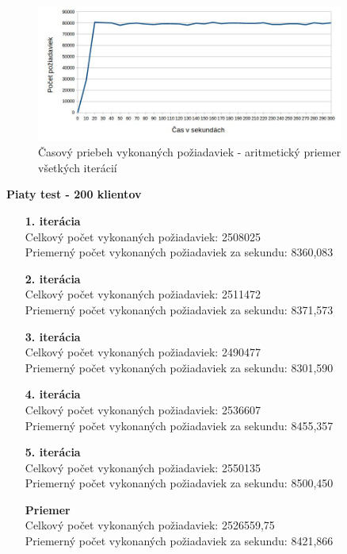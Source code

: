 \documentclass[12pt,oneside,final]{fithesis-utf8}
\begin{document}
\begin{itemize}
\begin{figure}[H]
  \centering
      \includegraphics[width=0.9\textwidth]{gatling2_4_distr.jpg}
  \caption{Časový priebeh vykonaných požiadaviek - aritmetický priemer všetkých iterácií}
\end{figure}

\textbf{Piaty test - 200 klientov}
\begin{itemize}

\item[\textbf{1. iterácia}]\ \\
Celkový počet vykonaných požiadaviek: 2508025\\
Priemerný počet vykonaných požiadaviek za sekundu: 8360,083

\item[\textbf{2. iterácia}]\ \\
Celkový počet vykonaných požiadaviek: 2511472\\
Priemerný počet vykonaných požiadaviek za sekundu: 8371,573

\item[\textbf{3. iterácia}]\ \\
Celkový počet vykonaných požiadaviek: 2490477\\
Priemerný počet vykonaných požiadaviek za sekundu: 8301,590

\item[\textbf{4. iterácia}]\ \\
Celkový počet vykonaných požiadaviek: 2536607\\
Priemerný počet vykonaných požiadaviek za sekundu: 8455,357

\item[\textbf{5. iterácia}]\ \\
Celkový počet vykonaných požiadaviek: 2550135\\
Priemerný počet vykonaných požiadaviek za sekundu: 8500,450

\item[\textbf{Priemer}]\ \\
Celkový počet vykonaných požiadaviek: 2526559,75\\
Priemerný počet vykonaných požiadaviek za sekundu: 8421,866


\end{itemize}
\end{itemize}
\end{document}
